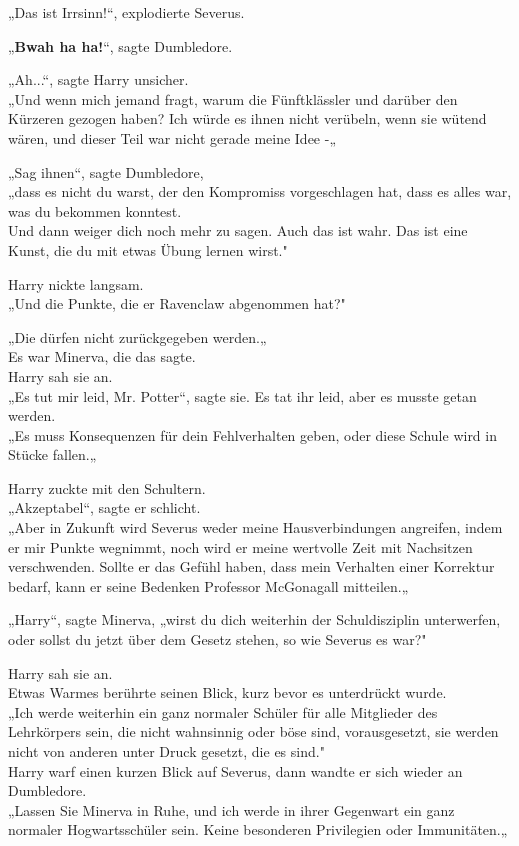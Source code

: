 {„Das ist Irrsinn!“, explodierte Severus.

„\textbf{Bwah ha ha!}“, sagte Dumbledore.

„Ah...“, sagte Harry unsicher.\\ „Und wenn mich jemand fragt, warum die Fünftklässler und darüber den Kürzeren gezogen haben? Ich würde es ihnen nicht verübeln, wenn sie wütend wären, und dieser Teil war nicht gerade meine Idee -„

„Sag ihnen“, sagte Dumbledore,\\ „dass es nicht du warst, der den Kompromiss vorgeschlagen hat, dass es alles war, was du bekommen konntest.\\ Und dann weiger dich noch mehr zu sagen. Auch das ist wahr. Das ist eine Kunst, die du mit etwas Übung lernen wirst."

Harry nickte langsam.\\ „Und die Punkte, die er Ravenclaw abgenommen hat?"

„Die dürfen nicht zurückgegeben werden.„\\ Es war Minerva, die das sagte.\\ Harry sah sie an.\\ „Es tut mir leid, Mr. Potter“, sagte sie. Es tat ihr leid, aber es musste getan werden.\\ „Es muss Konsequenzen für dein Fehlverhalten geben, oder diese Schule wird in Stücke fallen.„

Harry zuckte mit den Schultern.\\ „Akzeptabel“, sagte er schlicht.\\ „Aber in Zukunft wird Severus weder meine Hausverbindungen angreifen, indem er mir Punkte wegnimmt, noch wird er meine wertvolle Zeit mit Nachsitzen verschwenden. Sollte er das Gefühl haben, dass mein Verhalten einer Korrektur bedarf, kann er seine Bedenken Professor McGonagall mitteilen.„

„Harry“, sagte Minerva, „wirst du dich weiterhin der Schuldisziplin unterwerfen, oder sollst du jetzt über dem Gesetz stehen, so wie Severus es war?"

Harry sah sie an.\\ Etwas Warmes berührte seinen Blick, kurz bevor es unterdrückt wurde.\\ „Ich werde weiterhin ein ganz normaler Schüler für alle Mitglieder des Lehrkörpers sein, die nicht wahnsinnig oder böse sind, vorausgesetzt, sie werden nicht von anderen unter Druck gesetzt, die es sind."\\ Harry warf einen kurzen Blick auf Severus, dann wandte er sich wieder an Dumbledore.\\ „Lassen Sie Minerva in Ruhe, und ich werde in ihrer Gegenwart ein ganz normaler Hogwartsschüler sein. Keine besonderen Privilegien oder Immunitäten.„

}
